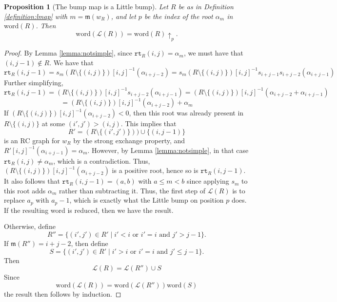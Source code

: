 \documentclass{amsart}
\newtheorem{proposition}[lemma]{Proposition}
\theoremstyle{definition}
\theoremstyle{remark}
\numberwithin{equation}{subsection}
\newcommand{\wof}[1]{w_{#1}}
\newcommand{\rtt}{\mathtt{rt}}
\newcommand{\lmap}{\mathscr{L}}
\newcommand{\ltb}[2]{#1\!\uparrow_{#2}}
\newcommand{\maxd}{\mathfrak{m}}
\begin{document}
\begin{proposition}[The bump map is a Little bump]\label{proposition:little_bump}
Let $R$ be as in Definition \ref{definition:lmap} with $m=\maxd(\wof R)$, and let $p$ be the index of the root $\alpha_m$ in $\mathrm{word}(R)$. Then
$$\mathrm{word}(\lmap(R))=\ltb{\mathrm{word}(R)}{p}.$$
\end{proposition}
\begin{proof}
  By Lemma \ref{lemma:notsimple}, since $\rtt_R(i,j) = \alpha_m$, we must have that $(i,j-1)\notin R$. We have that
  $$\rtt_R(i,j-1)=s_m(R\setminus \{(i,j)\})[i,j]^{-1}(\alpha_{i + j - 2}) = s_m(R\setminus \{(i,j)\})[i,j]^{-1}s_{i+j-1}s_{i+j-2}(\alpha_{i + j - 1})$$
  Further simplifying,
  $$\rtt_R(i,j-1)=(R\setminus \{(i,j)\})[i,j]^{-1}s_{i+j-2}(\alpha_{i + j - 1})=(R\setminus \{(i,j)\})[i,j]^{-1}(\alpha_{i+j-2}+\alpha_{i + j - 1})$$
  $$=(R\setminus \{(i,j)\})[i,j]^{-1}(\alpha_{i+j-2}) + \alpha_m$$
  If $(R\setminus \{(i,j)\})[i,j]^{-1}(\alpha_{i+j-2}) < 0$, then this root was already present in $R\setminus \{(i,j)\}$ at some $(i',j')>(i,j)$. This implies that
  $$R' = (R\setminus \{(i',j')\}))\cup \{(i,j - 1)\}$$
  is an RC graph for $\wof{R}$ by the strong exchange property, and $R'[i,j]^{-1}(\alpha_{i+j-1}) = \alpha_m$. However, by Lemma \ref{lemma:notsimple}, in that case $\rtt_R(i,j)\neq \alpha_m$, which is a contradiction. Thus, $(R\setminus \{(i,j)\})[i,j]^{-1}(\alpha_{i+j-2})$ is a positive root, hence so is $\rtt_R(i,j-1)$. It also follows that $\rtt_R(i,j-1)=(a,b)$ with $a\leq m<b$ since applying $s_m$ to this root adds $\alpha_m$ rather than subtracting it. Thus, the first step of $\lmap(R)$ is to replace $a_p$ with $a_p-1$, which is exactly what the Little bump on position $p$ does. If the resulting word is reduced, then we have the result. 

  Otherwise, define
  $$R'' = \{(i',j')\in R'\mid i' < i\text{ or }i'=i\text{ and }j'>j-1\}.$$
  If $\maxd(R'') = i + j - 2$, then define
  $$S = \{(i',j')\in R'\mid i'>i\text{ or }i'=i\text{ and }j'\leq j-1\}.$$
  Then
  $$\lmap(R) = \lmap(R'') \cup S$$
  Since
  $$\mathrm{word}(\lmap(R)) = \mathrm{word}(\lmap(R''))\mathrm{word}(S)$$
  the result then follows by induction.


  


\end{proof}
\end{document}
